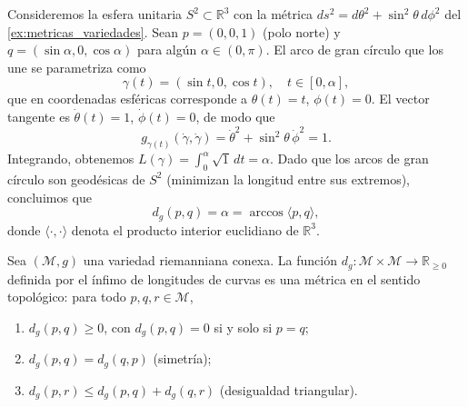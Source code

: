 \begin{example}\label{ex:longitud_esfera}
Consideremos la esfera unitaria $S^2 \subset \mathbb{R}^3$ con la métrica $ds^2 = d\theta^2 + \sin^2\theta\,d\phi^2$ del \autoref{ex:metricas_variedades}. Sean $p = (0,0,1)$ (polo norte) y $q = (\sin\alpha, 0, \cos\alpha)$ para algún $\alpha \in (0, \pi)$. El arco de gran círculo que los une se parametriza como
\[
\gamma(t) = (\sin t, 0, \cos t), \quad t \in [0, \alpha],
\]
que en coordenadas esféricas corresponde a $\theta(t) = t$, $\phi(t) = 0$. El vector tangente es $\dot\theta(t) = 1$, $\dot\phi(t) = 0$, de modo que
\[
g_{\gamma(t)}(\dot\gamma, \dot\gamma) = \dot\theta^2 + \sin^2\theta\,\dot\phi^2 = 1.
\]
Integrando, obtenemos $L(\gamma) = \int_0^\alpha \sqrt{1}\,dt = \alpha$. Dado que los arcos de gran círculo son geodésicas de $S^2$ (minimizan la longitud entre sus extremos), concluimos que
\[
d_g(p, q) = \alpha = \arccos\langle p, q \rangle,
\]
donde $\langle \cdot, \cdot \rangle$ denota el producto interior euclidiano de $\mathbb{R}^3$.
\end{example}

\begin{proposition}\label{prop:dg_metrica}
Sea $(\mathcal{M}, g)$ una variedad riemanniana conexa. La función $d_g: \mathcal{M} \times \mathcal{M} \to \mathbb{R}_{\geq 0}$ definida por el ínfimo de longitudes de curvas es una métrica en el sentido topológico: para todo $p, q, r \in \mathcal{M}$,
\begin{enumerate}
	\item $d_g(p,q) \geq 0$, con $d_g(p,q) = 0$ si y solo si $p = q$;
	\item $d_g(p,q) = d_g(q,p)$ (simetría);
	\item $d_g(p,r) \leq d_g(p,q) + d_g(q,r)$ (desigualdad triangular).
\end{enumerate}
\end{proposition}

